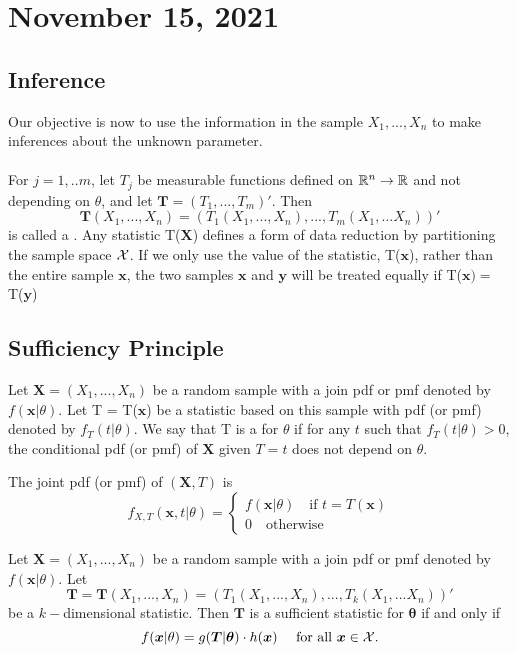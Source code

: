 \section{November 15, 2021}
\subsection{Inference}
Our objective is now to use the information in the sample $X_1,...,X_n$ to make inferences about the unknown parameter.
\\
\\ 
For $j = 1,..m$, let $T_j$ be measurable functions defined on $\mathbb R^n \to \mathbb R$ and not depending on $\theta$, and let $\boldsymbol{T} = (T_1,...,T_m)'$. Then
    $$
    \boldsymbol{T}(X_1,...,X_n) = \left(
    T_1(X_1,...,X_n),...,T_m(X_1,...X_n)
    \right)'
    $$
is called a .
Any statistic T($\boldsymbol{X}$) defines a form of data reduction by partitioning the sample space $\mathcal X$. If we only use the value of the statistic, T($\boldsymbol{x}$), rather than the entire sample $\boldsymbol{x}$, the two samples $\boldsymbol{x}$ and $\boldsymbol{y}$ will be treated equally if T($\boldsymbol{x}) =$ T($\boldsymbol{y}$) 
\subsection{Sufficiency Principle}
\begin{definition}
    Let $\boldsymbol{X} = (X_1,...,X_n)$ be a random sample with a join pdf or pmf denoted by $f(\boldsymbol{x}|\theta)$. Let T = T($\boldsymbol{x}$)
    be a statistic based on this sample with pdf (or pmf) denoted by $f_T(t|\theta)$. We say that T is a  for $\theta$ if for any $t$ such that $f_T(t|\theta) > 0$, the conditional pdf (or pmf) of $\boldsymbol{X}$ given $T=t$ does not depend on $\theta$.
    \end{definition}
 The joint pdf (or pmf) of $(\boldsymbol{X},T)$ is 
    $$
    f_{X,T}(\boldsymbol{x},t| \theta) =
        \begin{cases}
            f(\boldsymbol{x}| \theta) \quad \text{if } t= T(\boldsymbol{x}) \\
            0 \quad \text{otherwise}
        \end{cases}
    $$
    
\begin{theorem}
    Let $\boldsymbol{X} = (X_1,...,X_n)$ be a random sample with a join pdf or pmf denoted by $f(\boldsymbol{x}|\theta)$. Let
    $$\boldsymbol{T} = \boldsymbol{T}(X_1,...,X_n) = \left(
    T_1(X_1,...,X_n),...,T_k(X_1,...X_n)
    \right)'$$ be a $k-$dimensional statistic. Then $\boldsymbol{T}$ is a sufficient statistic for $\boldsymbol{\theta}$ if and only if 
    $$
    f(\boldsymbol{x}|\theta) = g(\boldsymbol{T}|\boldsymbol{\theta})\cdot h(\boldsymbol{x}) \quad \text{ for all } \boldsymbol{x} \in \mathcal X.
    $$
\end{theorem}